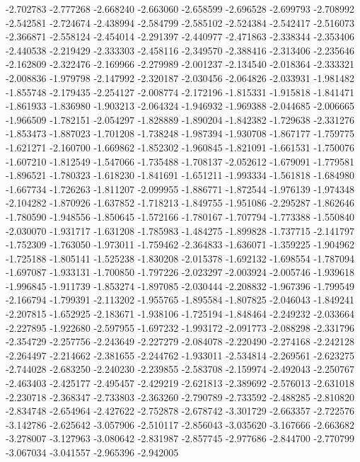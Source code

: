 -2.702783
-2.777268
-2.668240
-2.663060
-2.658599
-2.696528
-2.699793
-2.708992
-2.542581
-2.724674
-2.438994
-2.584799
-2.585102
-2.524384
-2.542417
-2.516073
-2.366871
-2.558124
-2.454014
-2.291397
-2.440977
-2.471863
-2.338344
-2.353406
-2.440538
-2.219429
-2.333303
-2.458116
-2.349570
-2.388416
-2.313406
-2.235646
-2.162809
-2.322476
-2.169966
-2.279989
-2.001237
-2.134540
-2.018364
-2.333321
-2.008836
-1.979798
-2.147992
-2.320187
-2.030456
-2.064826
-2.033931
-1.981482
-1.855748
-2.179435
-2.254127
-2.008774
-2.172196
-1.815331
-1.915818
-1.841471
-1.861933
-1.836980
-1.903213
-2.064324
-1.946932
-1.969388
-2.044685
-2.006665
-1.966509
-1.782151
-2.054297
-1.828889
-1.890204
-1.842382
-1.729638
-2.331276
-1.853473
-1.887023
-1.701208
-1.738248
-1.987394
-1.930708
-1.867177
-1.759775
-1.621271
-2.160700
-1.669862
-1.852302
-1.960845
-1.821091
-1.661531
-1.750076
-1.607210
-1.812549
-1.547066
-1.735488
-1.708137
-2.052612
-1.679091
-1.779581
-1.896521
-1.780323
-1.618230
-1.841691
-1.651211
-1.993334
-1.561818
-1.684980
-1.667734
-1.726263
-1.811207
-2.099955
-1.886771
-1.872544
-1.976139
-1.974348
-2.104282
-1.870926
-1.637852
-1.718213
-1.849755
-1.951086
-2.295287
-1.862646
-1.780590
-1.948556
-1.850645
-1.572166
-1.780167
-1.707794
-1.773388
-1.550840
-2.030070
-1.931717
-1.631208
-1.785983
-1.484275
-1.899828
-1.737715
-2.141797
-1.752309
-1.763050
-1.973011
-1.759462
-2.364833
-1.636071
-1.359225
-1.904962
-1.725188
-1.805141
-1.525238
-1.830208
-2.015378
-1.692132
-1.698554
-1.787094
-1.697087
-1.933131
-1.700850
-1.797226
-2.023297
-2.003924
-2.005746
-1.939618
-1.996845
-1.911739
-1.853274
-1.897085
-2.030444
-2.208832
-1.967396
-1.799549
-2.166794
-1.799391
-2.113202
-1.955765
-1.895584
-1.807825
-2.046043
-1.849241
-2.207815
-1.652925
-2.183671
-1.938106
-1.725194
-1.848464
-2.249232
-2.033664
-2.227895
-1.922680
-2.597955
-1.697232
-1.993172
-2.091773
-2.088298
-2.331796
-2.354729
-2.257756
-2.243649
-2.227279
-2.084078
-2.220490
-2.274168
-2.242128
-2.264497
-2.214662
-2.381655
-2.244762
-1.933011
-2.534814
-2.269561
-2.623275
-2.744028
-2.683250
-2.240230
-2.239855
-2.583708
-2.159974
-2.492043
-2.250767
-2.463403
-2.425177
-2.495457
-2.429219
-2.621813
-2.389692
-2.576013
-2.631018
-2.230718
-2.368347
-2.733803
-2.363260
-2.790789
-2.733592
-2.488285
-2.810820
-2.834748
-2.654964
-2.427622
-2.752878
-2.678742
-3.301729
-2.663357
-2.722576
-3.142786
-2.625642
-3.057906
-2.510117
-2.856043
-3.035620
-3.167666
-2.663682
-3.278007
-3.127963
-3.080642
-2.831987
-2.857745
-2.977686
-2.844700
-2.770799
-3.067034
-3.041557
-2.965396
-2.942005
